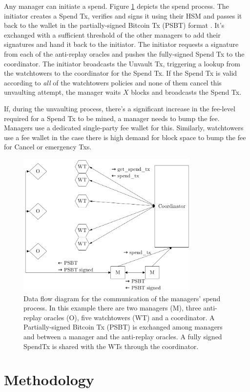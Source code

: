 \documentclass[runningheads]{llncs}
\begin{document}
Any manager can initiate a spend. Figure \ref{fig:spend_tx_exchange} depicts the spend process. The initiator creates a Spend Tx, verifies and signs it using their HSM and passes it back to the wallet in the partially-signed Bitcoin Tx (PSBT) format \cite{BIP174}. It's  exchanged with a sufficient threshold of the other managers to add their signatures and hand it back to the initiator. The initiator requests a signature from each of the anti-replay oracles and pushes the fully-signed Spend Tx to the coordinator.  
The initiator broadcasts the Unvault Tx, triggering a lookup from the watchtowers to the coordinator for the Spend Tx. If the Spend Tx is valid according to \textit{all} of the watchtowers policies and none of them cancel this unvaulting attempt, the manager waits $X$ blocks and broadcasts the Spend Tx. 

If, during the unvaulting process, there's a significant increase in the fee-level required for a Spend Tx to be mined, a manager needs to bump the fee. Managers use a dedicated single-party fee wallet for this. Similarly, watchtowers use a fee wallet in the case there is high demand for block space to bump the fee for Cancel or emergency Txs. 

\begin{figure}[t]
\centering
    \includegraphics[width=9cm]{spend_tx_sharing.png}
    \caption{Data flow diagram for the communication of the managers' spend process. In this example there are two managers (M), three anti-replay oracles (O), five watchtowers (WT) and a coordinator. A Partially-signed Bitcoin Tx (PSBT) is exchanged among managers and between a manager and the anti-replay oracles. A fully signed SpendTx is shared with the WTs through the coordinator.}
    \label{fig:spend_tx_exchange}
\end{figure}

\section{Methodology}
\label{sec:Methodology}
\end{document}
